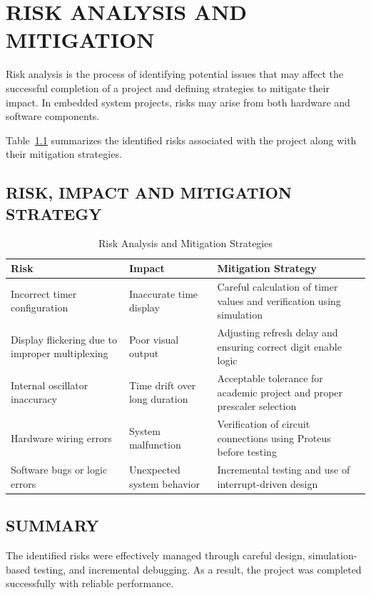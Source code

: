 \chapter{RISK ANALYSIS AND MITIGATION}%
\label{chap:risk_analysis_and_mitigation}

Risk analysis is the process of identifying potential issues that may affect the successful 
completion of a project and defining strategies to mitigate their impact. In embedded system 
projects, risks may arise from both hardware and software components.

Table~\ref{tab:risk_analysis} summarizes the identified risks associated with the \textbf{\Project{}} 
project along with their mitigation strategies.

\section{RISK, IMPACT AND MITIGATION STRATEGY}

\begin{table}
\centering
\begin{tabular}{|p{4cm}|p{4cm}|p{6.5cm}|}
\hline
\textbf{Risk} & \textbf{Impact} & \textbf{Mitigation Strategy} \\
\hline
Incorrect timer configuration & Inaccurate time display & Careful calculation of timer values and verification using simulation \\
\hline
Display flickering due to improper multiplexing & Poor visual output & Adjusting refresh delay and ensuring correct digit enable logic \\
\hline
Internal oscillator inaccuracy & Time drift over long duration & Acceptable tolerance for academic project and proper prescaler selection \\
\hline
Hardware wiring errors & System malfunction & Verification of circuit connections using Proteus before testing \\
\hline
Software bugs or logic errors & Unexpected system behavior & Incremental testing and use of interrupt-driven design \\
\hline
\end{tabular}
\caption{Risk Analysis and Mitigation Strategies}%
\label{tab:risk_analysis}
\end{table}

\section{SUMMARY}
The identified risks were effectively managed through careful design, simulation-based testing, 
and incremental debugging. As a result, the project was completed successfully with reliable 
performance.
